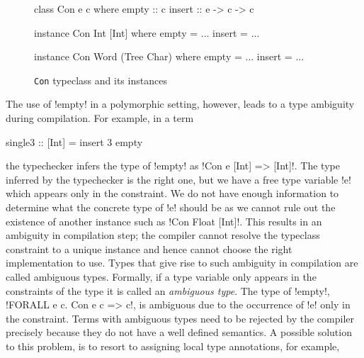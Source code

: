 \documentclass[screen,nonacm]{acmart}
\begin{document}
\begin{figure}[ht]
\centering
\begin{minipage}[ht]{0.3\linewidth}
\begin{CenteredBox}
\begin{code}
class Con e c
where
  empty :: c
  insert :: e -> c -> c
\end{code}
\end{CenteredBox}
\end{minipage}%
\begin{minipage}[ht]{0.3\linewidth}
\begin{CenteredBox}
\begin{code}
instance Con Int [Int]
where
  empty = ...
  insert = ...
\end{code}
\end{CenteredBox}
\end{minipage}%
\begin{minipage}[ht]{0.3\linewidth}
\begin{CenteredBox}
\begin{code}
instance Con Word (Tree Char)
where
  empty = ...
  insert = ...
\end{code}
\end{CenteredBox}
\end{minipage}
\caption[\lstinline{Con} typeclass]{\lstinline{Con} typeclass and its instances}
\label{fig:tc-collection}
\end{figure}

The use of !empty! in a polymorphic setting, however, leads to a type ambiguity during
compilation. For example, in a term

\begin{CenteredBox}
\begin{code}
single3 :: [Int] = insert 3 empty
\end{code}
\end{CenteredBox}

the typechecker infers the type of !empty! as !Con e [Int] => [Int]!. The type inferred by
the typechecker is the right one, but we have a free type variable
!e! which appears only in the constraint. We do not have enough
information to determine what the concrete type of !e! should be as
we cannot rule out the existence of another instance such as !Con Float [Int]!.
This results in an ambiguity in compilation step; the compiler cannot
resolve the typeclass constraint to a unique instance and hence cannot
choose the right implementation to use. Types that
give rise to such ambiguity in compilation are called ambiguous types. Formally, if a
type variable only appears in the constraints of the type it is called
an \emph{ambiguous type}. The type of !empty!,
!FORALL e c. Con e c => c!, is ambiguous due to the occurrence of !e! only in the
constraint. Terms with ambiguous types need to be rejected by the compiler
precisely because they do not have a well defined semantics.
A possible solution to this problem, is to resort to assigning local
type annotations, for example,
\end{document}
